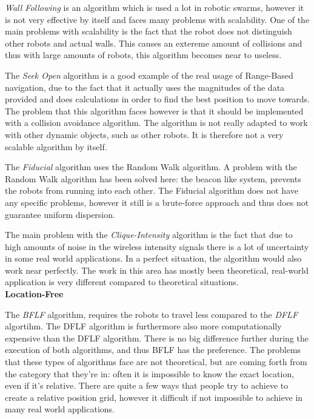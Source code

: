   \emph{Wall Following} is an algorithm which is used a lot in robotic swarms, however it is not very effective by itself and faces many problems with scalability.  One of the main problems with scalability is the fact that the robot does not distinguish other robots and actual walls. This causes an extereme amount of collisions and thus with large amounts of robots, this algorithm becomes near to useless. 

  The \emph{Seek Open} algorithm is a good example of the real usage of Range-Based navigation, due to the fact that it actually uses the magnitudes of the data provided and does calculations in order to find the best position to move towards. The problem that this algorithm faces however is that it should be implemented with a collision avoidance algorithm. The algorithm is not really adapted to work with other dynamic objects, such as other robots. It is therefore not a very scalable algorithm by itself.

  The \emph{Fiducial} algorithm uses the Random Walk algorithm. A problem with the Random Walk algorithm has been solved here: the beacon like system, prevents the robots from running into each other. The Fiducial algorithm does not have any specific problems, however it still is a brute-force approach and thus does not guarantee uniform dispersion.

  The main problem with the \emph{Clique-Intensity} algorithm is the fact that due to high amounts of noise in the wireless intensity signals there is a lot of uncertainty in some real world applications. In a perfect situation, the algorithm would also work near perfectly. The work in this area has mostly been theoretical, real-world application is very different compared to theoretical situations.\\

  \textbf{Location-Free}

  The \emph{BFLF} algorithm, requires the robots to travel less compared to the \emph{DFLF} algortihm. The DFLF algorithm is furthermore also more computationally expensive than the DFLF algorithm. There is no big difference further during the execution of both algorithms, and thus BFLF has the preference. The problems that these types of algorithms face are not theoretical, but are coming forth from the category that they're in: often it is impossible to know the exact location, even if it's relative. There are quite a few ways that people try to achieve to create a relative position grid, however it difficult if not impossible to achieve in many real world applications.\\

